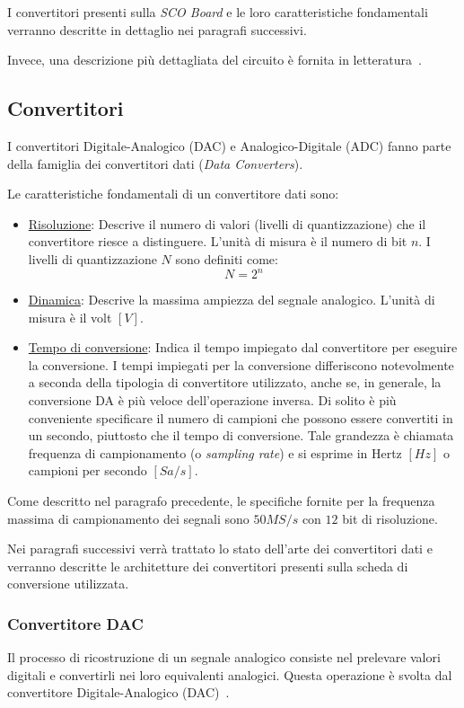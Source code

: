 I convertitori presenti sulla \textit{SCO Board} e le loro caratteristiche fondamentali verranno descritte in dettaglio nei paragrafi successivi.

Invece, una descrizione più dettagliata del circuito è fornita in letteratura~\cite{thesissmldis}.

\subsection{Convertitori}
I convertitori Digitale-Analogico (DAC) e Analogico-Digitale (ADC) fanno parte della famiglia dei convertitori dati (\textit{Data Converters}).

Le caratteristiche fondamentali di un convertitore dati sono:
\begin{itemize}
	\item \underline{Risoluzione}: Descrive il numero di valori (livelli di quantizzazione) che il convertitore riesce a distinguere. L'unità di misura è il numero di bit $n$. I livelli di quantizzazione $N$ sono definiti come:
	\begin{equation}
		N=2^n
	\end{equation}
	\item \underline{Dinamica}: Descrive la massima ampiezza del segnale analogico. L'unità di misura è il volt $[V]$.
	\item \underline{Tempo di conversione}: Indica il tempo impiegato dal convertitore per eseguire la conversione. I tempi impiegati per la conversione differiscono notevolmente a seconda della tipologia di convertitore utilizzato, anche se, in generale, la conversione DA è più veloce dell'operazione inversa. Di solito è più conveniente specificare il numero di campioni che possono essere convertiti in un secondo, piuttosto che il tempo di conversione. Tale grandezza è chiamata frequenza di campionamento (o \textit{sampling rate}) e si esprime in Hertz $[Hz]$ o campioni per secondo $[Sa/s]$.
\end{itemize}

Come descritto nel paragrafo precedente, le specifiche fornite per la frequenza massima di campionamento dei segnali sono $50MS/s$ con $12$ bit di risoluzione.

Nei paragrafi successivi verrà trattato lo stato dell'arte dei convertitori dati e verranno descritte le architetture dei convertitori presenti sulla scheda di conversione utilizzata.

\subsubsection{Convertitore DAC}
Il processo di ricostruzione di un segnale analogico consiste nel prelevare valori digitali e convertirli nei loro equivalenti analogici. Questa operazione è svolta dal convertitore Digitale-Analogico (DAC)~\cite{storeyelet}.

